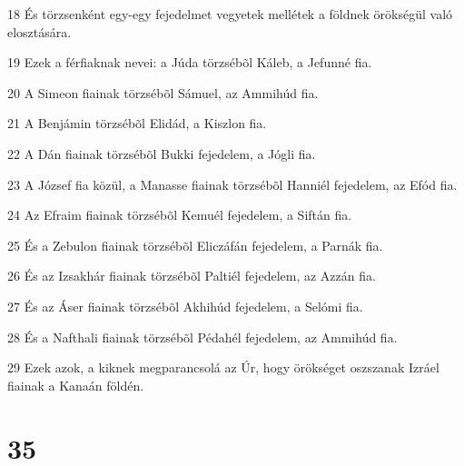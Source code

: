 \par 18 És törzsenként egy-egy fejedelmet vegyetek mellétek a földnek örökségül való elosztására.
\par 19 Ezek a férfiaknak nevei: a Júda törzsébõl Káleb, a Jefunné fia.
\par 20 A Simeon fiainak törzsébõl Sámuel, az Ammihúd fia.
\par 21 A Benjámin törzsébõl Elidád, a Kiszlon fia.
\par 22 A Dán fiainak törzsébõl Bukki fejedelem, a Jógli fia.
\par 23 A József fia közül, a Manasse fiainak törzsébõl Hanniél fejedelem, az Efód fia.
\par 24 Az Efraim fiainak törzsébõl Kemuél fejedelem, a Siftán fia.
\par 25 És a Zebulon fiainak törzsébõl Eliczáfán fejedelem, a Parnák fia.
\par 26 És az Izsakhár fiainak törzsébõl Paltiél fejedelem, az Azzán fia.
\par 27 És az Áser fiainak törzsébõl Akhihúd fejedelem, a Selómi fia.
\par 28 És a Nafthali fiainak törzsébõl Pédahél fejedelem, az Ammihúd fia.
\par 29 Ezek azok, a kiknek megparancsolá az Úr, hogy örökséget oszszanak Izráel fiainak a Kanaán földén.

\chapter{35}

